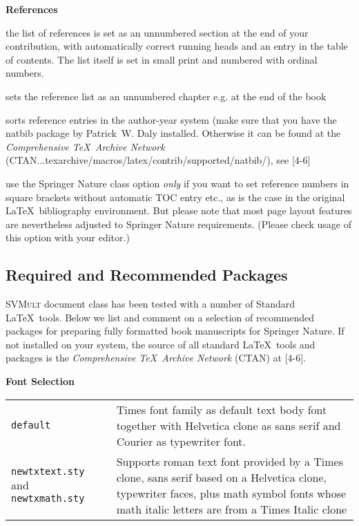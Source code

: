 \documentclass[graybox]{svmult}
\begin{document}
\begin{refguide}
\begin{sloppy}
\textbf{References}

\begin{description}
\item[\textit{default}] the list of references is set as an unnumbered section at
the end of your contribution, with automatically correct
running heads and an entry in the table of contents. The
list itself is set in small print and numbered with ordinal
numbers.
\item[\textit{chaprefs}] sets the reference list as an unnumbered chapter
e.g. at the end of the book
\item[\textit{natbib}] sorts reference entries in the author-year system
(make sure that you have the natbib package by
Patrick~W. Daly installed. Otherwise it can be found at
the \textit{Comprehensive \TeX\ Archive Network} (CTAN...texarchive/macros/latex/contrib/supported/natbib/), see [4-­6]
\item[\textit{oribibl}] use the Springer Nature class option \textit{only} if you want to set reference numbers in square brackets without automatic TOC
entry etc., as is the case in the original \LaTeX\ bibliography
environment. But please note that most page layout features are nevertheless adjusted to Springer Nature requirements.
(Please check usage of this option with your editor.)
\end{description}

\subsection{Required and Recommended Packages}\label{subsec:3}
\textsc{SVMult} document class has been tested with a number of Standard \LaTeX\
tools. Below we list and comment on a selection of recommended packages for
preparing fully formatted book manuscripts for Springer Nature. If not installed
on your system, the source of all standard \LaTeX\ tools and packages is the
\textit{Comprehensive \TeX\ Archive Network} (CTAN) at [4-­6].


\textbf{Font Selection}

\begin{tabular}{p{7.5pc}@{\qquad}p{18.5pc}}
\texttt{default} &Times font family as default text body font together with
Helvetica clone as sans serif and Courier as typewriter font.\\
\texttt{newtxtext.sty} and \texttt{newtxmath.sty} & Supports roman text font provided by a Times clone,  sans serif based on a Helvetica clone,  typewriter faces,  plus math symbol fonts whose math italic letters are from a Times Italic clone
\end{tabular}


\end{sloppy}
\end{refguide}
\end{document}
